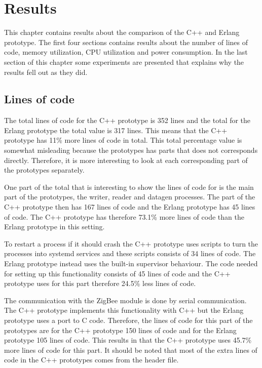 \chapter{Results}
This chapter contains results about the comparison of the C++ and Erlang prototype. The first four sections contains results about the number of lines of code, memory utilization, CPU utilization and power consumption. In the last section of this chapter some experiments are presented that explains why the results fell out as they did. 

\section{Lines of code}
The total lines of code for the C++ prototype is 352 lines and the total for the Erlang prototype the total value is 317 lines. This means that the C++ prototype has 11\% more lines of code in total. This total percentage value is somewhat misleading because the prototypes has parts that does not corresponds directly. Therefore, it is more interesting to look at each corresponding part of the prototypes separately. 

One part of the total that is interesting to show the lines of code for is the main part of the prototypes, the writer, reader and datagen processes. The part of the C++ prototype then has 167 lines of code and the Erlang prototype has 45 lines of code. The C++ prototype has therefore 73.1\% more lines of code than the Erlang prototype in this setting. 

To restart a process if it should crash the C++ prototype uses scripts to turn the processes into systemd services and these scripts consists of 34 lines of code.  The Erlang prototype instead uses the built-in supervisor behaviour. The code needed for setting up this functionality consists of 45 lines of code and the C++ prototype uses for this part therefore 24.5\% less lines of code. 

The communication with the ZigBee module is done by serial communication. The C++ prototype implements this functionality with C++ but the Erlang prototype uses a port to C code. Therefore, the lines of code for this part of the prototypes are for the C++ prototype 150 lines of code and for the Erlang prototype 105 lines of code.  This results in that the C++ prototype uses 45.7\% more lines of code for this part. It should be noted that most of the extra lines of code in the C++ prototypes comes from the header file.

